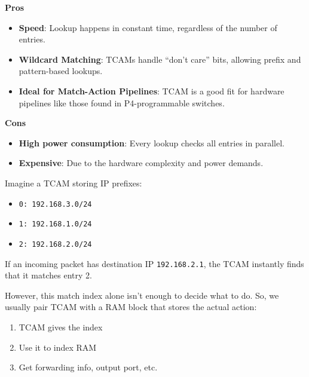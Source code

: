 \highspace
\begin{flushleft}
    \textcolor{Green3}{ \textbf{Pros}}
\end{flushleft}
\begin{itemize}[label=\textcolor{Green3}{}]
    \item \textcolor{Green3}{\textbf{Speed}}: Lookup happens in constant time, regardless of the number of entries.
    \item \textcolor{Green3}{\textbf{Wildcard Matching}}: TCAMs handle ``don't care'' bits, allowing prefix and pattern-based lookups.
    \item \textcolor{Green3}{\textbf{Ideal for Match-Action Pipelines}}: TCAM is a good fit for hardware pipelines like those found in P4-programmable switches.
\end{itemize}

\highspace
\begin{flushleft}
    \textcolor{Red2}{ \textbf{Cons}}
\end{flushleft}
\begin{itemize}[label=\textcolor{Red2}{}]
    \item \textcolor{Red2}{\textbf{High power consumption}}: Every lookup checks all entries in parallel.
    \item \textcolor{Red2}{\textbf{Expensive}}: Due to the hardware complexity and power demands.
\end{itemize}

\begin{examplebox}
    Imagine a TCAM storing IP prefixes:
    \begin{itemize}
        \item \texttt{0: 192.168.3.0/24}
        \item \texttt{1: 192.168.1.0/24}
        \item \texttt{2: 192.168.2.0/24}
    \end{itemize}
    If an incoming packet has destination IP \texttt{192.168.2.1}, the TCAM instantly finds that it matches entry 2.

    However, this match index alone isn't enough to decide what to do. So, we usually pair TCAM with a RAM block that stores the actual action:
    \begin{enumerate}
        \item TCAM gives the index
        \item Use it to index RAM
        \item Get forwarding info, output port, etc.
    \end{enumerate}
\end{examplebox}

